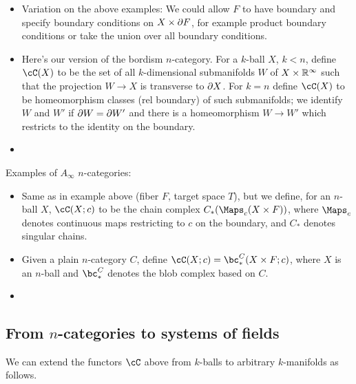 \begin{itemize}
\item Variation on the above examples:
We could allow $F$ to have boundary and specify boundary conditions on $X\times \partial F$,
for example product boundary conditions or take the union over all boundary conditions.

\item Here's our version of the bordism $n$-category.
For a $k$-ball $X$, $k<n$, define $\cC(X)$ to be the set of all $k$-dimensional
submanifolds $W$ of $X\times \mathbb{R}^\infty$ such that the projection $W \to X$ is transverse
to $\partial X$.
For $k=n$ define $\cC(X)$ to be homeomorphism classes (rel boundary) of such submanifolds;
we identify $W$ and $W'$ if $\partial W = \partial W'$ and there is a homeomorphism
$W\to W'$ which restricts to the identity on the boundary.

\item {}

\end{itemize}


Examples of $A_\infty$ $n$-categories:
\begin{itemize}

\item Same as in example  above (fiber $F$, target space $T$),
but we define, for an $n$-ball $X$, $\cC(X; c)$ to be the chain complex 
$C_*(\Maps_c(X\times F))$, where $\Maps_c$ denotes continuous maps restricting to $c$ on the boundary,
and $C_*$ denotes singular chains.

\item
Given a plain $n$-category $C$, 
define $\cC(X; c) = \bc^C_*(X\times F; c)$, where $X$ is an $n$-ball
and $\bc^C_*$ denotes the blob complex based on $C$.

\item {}

\end{itemize}






\subsection{From $n$-categories to systems of fields}
\label{ss:ncat_fields}

We can extend the functors $\cC$ above from $k$-balls to arbitrary $k$-manifolds as follows.

